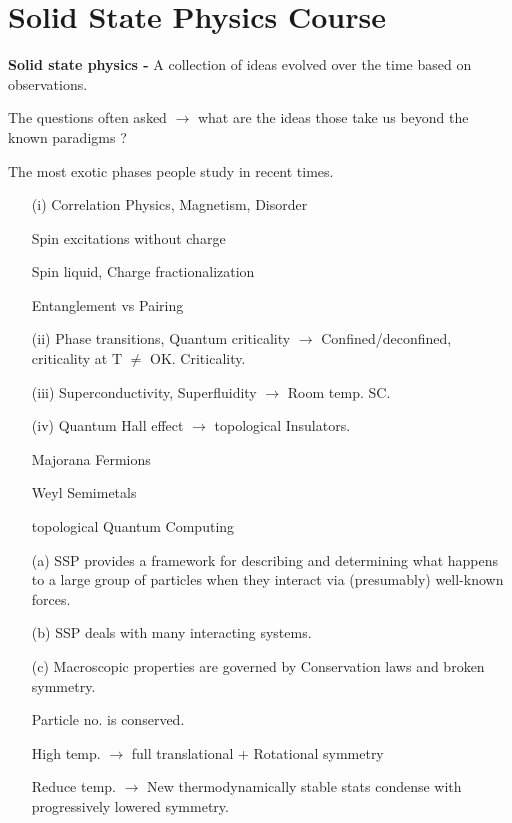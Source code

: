 \chapter{Solid State Physics Course}\label{chap1}

\textbf{Solid state physics -} A collection of ideas evolved over the time based on observations.

The questions often asked $\to$ what are the ideas those take us beyond the known paradigms ?

The most exotic phases people study in recent times.
\begin{itemize}
\item[(i)] Correlation Physics, Magnetism, Disorder

Spin excitations without charge

Spin liquid, Charge fractionalization 

Entanglement vs Pairing

\item[(ii)] Phase transitions, Quantum criticality $\to$ Confined/deconfined, criticality at T $\neq$ OK. Criticality.

\item[(iii)] Superconductivity, Superfluidity $\to$ Room temp. SC.

\item[(iv)] Quantum Hall effect $\to$ topological Insulators. 

Majorana Fermions

Weyl Semimetals

topological Quantum Computing
\end{itemize}
\begin{itemize}
\item[(a)] SSP provides a framework for describing and determining what happens to a large group of particles when they interact via (presumably) well-known forces.

\item[(b)] SSP deals with many interacting systems.

\item[(c)] Macroscopic properties are governed by Conservation laws and broken symmetry.

Particle no. is conserved.

High temp. $\to$ full translational + Rotational symmetry

Reduce temp. $\to$ New thermodynamically stable stats condense with progressively lowered symmetry.
\end{itemize}


